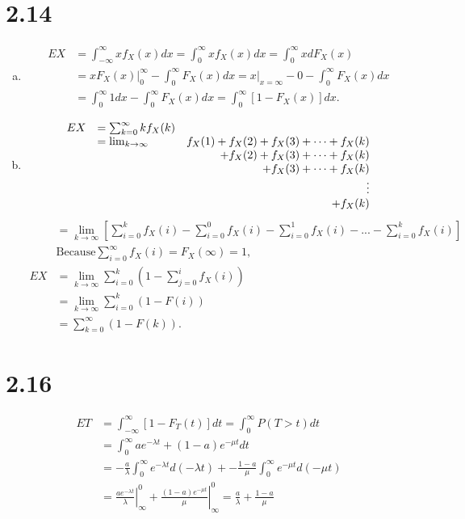 \documentclass[letterpaper]{article}
\newcommand{\fx}{f_X(x)}
\newcommand{\intii}{\int_{-\infty}^\infty}
\begin{document}
    \section*{2.14}
    \begin{enumerate}[(a)]
    \item \begin{align*}
    EX & = \intii x \fx dx = \int_0^\infty x \fx dx = \int_0^\infty x d F_X(x) \\
    & = \left.xF_X(x)\right|^\infty_0 - \int_0^\infty F_X(x) dx
    = x|_{x=\infty} - 0 - \int_0^\infty F_X(x) dx \\
    & = \int_0^\infty 1 dx - \int_0^\infty F_X(x) dx  = \int_0^\infty \left[1-F_X(x)\right] dx.
    \end{align*}
    \item \[
    \begin{array}{c l r}
    EX & = \sum_{k=0}^\infty k f_X(k) & \\
    & = \lim_{k \to \infty} & f_X(1) + f_X(2) + f_X(3) + \dots + f_X(k) \\
    & & + f_X(2) + f_X(3) + \dots + f_X(k) \\
    & & + f_X(3) + \dots + f_X(k) \\
    & & \vdots \\
    & & + f_X(k) \\
    \end{array}
    \]
    \begin{align*}
    & = \lim_{k \to \infty} \left[ \sum_{i=0}^k f_X(i) - \sum_{i=0}^0 f_X(i)
    -\sum_{i=0}^1f_X(i) - ... - \sum_{i=0}^k f_X(i) \right] \\
    & \text{Because} \sum_{i=0}^\infty f_X(i) = F_X(\infty) = 1, \\
    EX & = \lim_{k \to \infty} \sum_{i=0}^k \left( 1 - \sum_{j=0}^i f_X(i) \right) & & & \\
    & = \lim_{k \to \infty} \sum_{i=0}^k (1-F(i)) \\
    & = \sum_{k=0}^\infty (1-F(k)). 
    \end{align*}
    \end{enumerate}

    \section*{2.16}
    \begin{align*}
    E T & = \int_{-\infty}^\infty [1-F_T(t)]dt = \int_0^\infty P(T>t) dt \\
    & = \int_0^\infty ae^{-\lambda t} + (1-a)e^{-\mu t}dt \\
    & = -\frac{a}{\lambda} \int_0^\infty e^{-\lambda t} d (-\lambda t) + 
    - \frac{1-a}{\mu} \int_0^\infty e^{-\mu t} d(-\mu t) \\
    & = \left. \frac{a e^{-\lambda t}}{\lambda}\right|^0_\infty + 
    \left. \frac{(1-a)e^{-\mu t}}{\mu}\right|^0_\infty = \frac{a}{\lambda} + \frac{1-a}{\mu}
    \end{align*}
\end{document}
